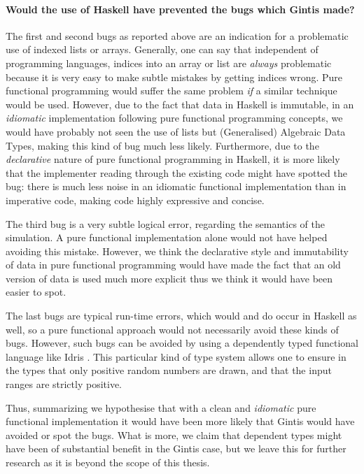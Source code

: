 \paragraph{Would the use of Haskell have prevented the bugs which Gintis made?}
The first and second bugs as reported above are an indication for a problematic use of indexed lists or arrays. Generally, one can say that independent of programming languages, indices into an array or list are \textit{always} problematic because it is very easy to make subtle mistakes by getting indices wrong. Pure functional programming would suffer the same problem \textit{if} a similar technique would be used. However, due to the fact that data in Haskell is immutable, in an \textit{idiomatic} implementation following pure functional programming concepts, we would have probably not seen the use of lists but (Generalised) Algebraic Data Types, making this kind of bug much less likely. Furthermore, due to the \textit{declarative} nature of pure functional programming in Haskell, it is more likely that the implementer reading through the existing code might have spotted the bug: there is much less noise in an idiomatic functional implementation than in imperative code, making code highly expressive and concise.

The third bug is a very subtle logical error, regarding the semantics of the simulation. A pure functional implementation alone would not have helped avoiding this mistake. However, we think the declarative style and immutability of data in pure functional programming would have made the fact that an old version of data is used much more explicit thus we think it would have been easier to spot.

The last bugs are typical run-time errors, which would and do occur in Haskell as well, so a pure functional approach would not necessarily avoid these kinds of bugs. However, such bugs can be avoided by using a dependently typed functional language like Idris \cite{brady_idris_2013}. This particular kind of type system allows one to ensure in the types that only positive random numbers are drawn, and that the input ranges are strictly positive.

Thus, summarizing we hypothesise that with a clean and \textit{idiomatic} pure functional implementation it would have been more likely that Gintis would have avoided or spot the bugs. What is more, we claim that dependent types might have been of substantial benefit in the Gintis case, but we leave this for further research as it is beyond the scope of this thesis. %

